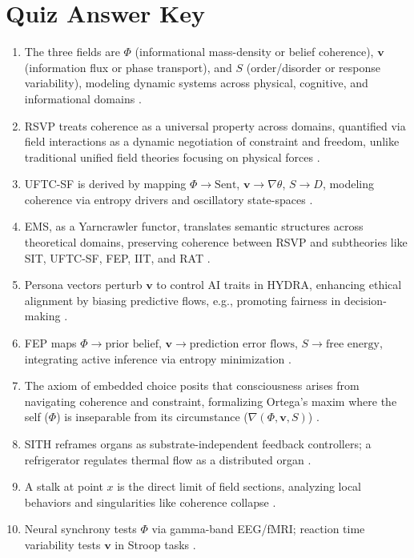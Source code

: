 \documentclass[12pt]{report}
\newcommand{\PhiRSVP}{\Phi}
\newcommand{\vRSVP}{\mathbf{v}}
\newcommand{\SRSVP}{S}
\begin{document}
{{{{\chapter{Quiz Answer Key}
\begin{enumerate}
    \item The three fields are \(\PhiRSVP\) (informational mass-density or belief coherence), \(\vRSVP\) (information flux or phase transport), and \(\SRSVP\) (order/disorder or response variability), modeling dynamic systems across physical, cognitive, and informational domains \citep{RSVPMeta2025}.
    \item RSVP treats coherence as a universal property across domains, quantified via field interactions as a dynamic negotiation of constraint and freedom, unlike traditional unified field theories focusing on physical forces \citep{RSVPMeta2025}.
    \item UFTC-SF is derived by mapping \(\PhiRSVP \to \text{Sent}\), \(\vRSVP \to \nabla\theta\), \(\SRSVP \to D\), modeling coherence via entropy drivers and oscillatory state-spaces \citep{Logan2025}.
    \item EMS, as a Yarncrawler functor, translates semantic structures across theoretical domains, preserving coherence between RSVP and subtheories like SIT, UFTC-SF, FEP, IIT, and RAT \citep{SocioeconomicFunctors2025}.
    \item Persona vectors perturb \(\vRSVP\) to control AI traits in HYDRA, enhancing ethical alignment by biasing predictive flows, e.g., promoting fairness in decision-making \citep{Chen2025, HYDRA2025}.
    \item FEP maps \(\PhiRSVP \to \text{prior belief}\), \(\vRSVP \to \text{prediction error flows}\), \(\SRSVP \to \text{free energy}\), integrating active inference via entropy minimization \citep{Friston2010}.
    \item The axiom of embedded choice posits that consciousness arises from navigating coherence and constraint, formalizing Ortega’s maxim where the self (\(\PhiRSVP\)) is inseparable from its circumstance (\(\nabla(\PhiRSVP, \vRSVP, \SRSVP)\)) \citep{SocioeconomicFunctors2025}.
    \item SITH reframes organs as substrate-independent feedback controllers; a refrigerator regulates thermal flow as a distributed organ \citep{SocioeconomicFunctors2025}.
    \item A stalk at point \(x\) is the direct limit of field sections, analyzing local behaviors and singularities like coherence collapse \citep{Bredon1997}.
    \item Neural synchrony tests \(\PhiRSVP\) via gamma-band EEG/fMRI; reaction time variability tests \(\vRSVP\) in Stroop tasks \citep{RSVPMeta2025, SemanticField2025}.
\end{enumerate}

}}}}
\end{document}
